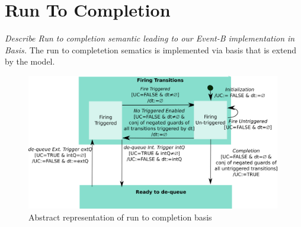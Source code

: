 

\section{Run To Completion}

\emph{Describe Run to completion semantic leading to our Event-B implementation in Basis.}
The run to completetion sematics is implemented via basis that is extend by the model.
\begin{figure}[!h]
	\vspace{-.4cm}
	\centering
	\includegraphics[width=0.99\textwidth]{figures/basis.png}
	\caption{Abstract representation of run to completion basis}
	\label{fig:basis}
	\vspace{-.4cm}
\end{figure}

